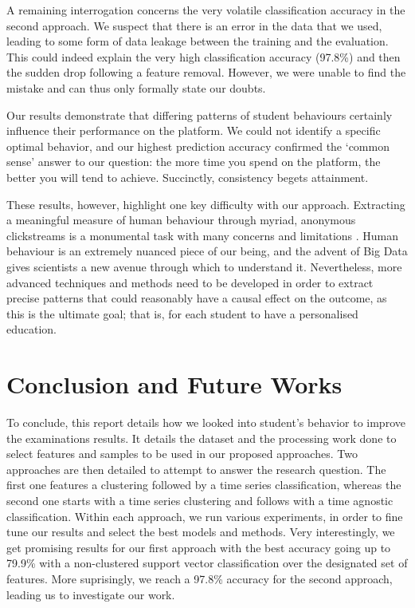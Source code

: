 \documentclass[sigplan,screen]{acmart}
\begin{document}
A remaining interrogation concerns the very volatile classification accuracy in the second approach. We suspect that there is an error in the data that we used, leading to some form of data leakage between the training and the evaluation. This could indeed explain the very high classification accuracy (97.8\%) and then the sudden drop following a feature removal. However, we were unable to find the mistake and can thus only formally state our doubts.

Our results demonstrate that differing patterns of student behaviours certainly influence their performance on the platform. We could not identify a specific optimal behavior, and our highest prediction accuracy confirmed the `common sense' answer to our question: the more time you spend on the platform, the better you will tend to achieve. Succinctly, consistency begets attainment. 

These results, however, highlight one key difficulty with our approach. Extracting a meaningful measure of human behaviour through myriad, anonymous clickstreams is a monumental task with many concerns and limitations \cite{meaningfulmeasures}. Human behaviour is an extremely nuanced piece of our being, and the advent of Big Data gives scientists a new avenue through which to understand it. Nevertheless, more advanced techniques and methods need to be developed in order to extract precise patterns that could reasonably have a causal effect on the outcome, as this is the ultimate goal; that is, for each student to have a personalised education. 





\section{Conclusion and Future Works}\label{sec:conclusion}

To conclude, this report details how we looked into student's behavior to improve the examinations results. It details the dataset and the processing work done to select features and samples to be used in our proposed approaches. Two approaches are then detailed to attempt to answer the research question. The first one features a clustering followed by a time series classification, whereas the second one starts with a time series clustering and follows with a time agnostic classification. Within each approach, we run various experiments, in order to fine tune our results and select the best models and methods. Very interestingly, we get promising results for our first approach with the best accuracy going up to 79.9\% with a non-clustered support vector classification over the designated set of features. More suprisingly, we reach a 97.8\% accuracy for the second approach, leading us to investigate our work. 
\end{document}
